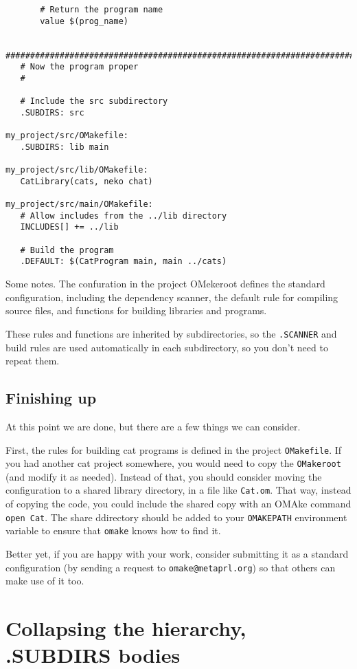 \begin{verbatim}
       # Return the program name
       value $(prog_name)

   ########################################################################
   # Now the program proper
   #

   # Include the src subdirectory
   .SUBDIRS: src

my_project/src/OMakefile:
   .SUBDIRS: lib main

my_project/src/lib/OMakefile:
   CatLibrary(cats, neko chat)

my_project/src/main/OMakefile:
   # Allow includes from the ../lib directory
   INCLUDES[] += ../lib

   # Build the program
   .DEFAULT: $(CatProgram main, main ../cats)
\end{verbatim}

Some notes.  The confuration in the project OMekeroot defines the standard configuration, including
the dependency scanner, the default rule for compiling source files, and functions for building
libraries and programs.

These rules and functions are inherited by subdirectories, so the \verb+.SCANNER+ and build rules
are used automatically in each subdirectory, so you don't need to repeat them.

\subsection{Finishing up}

At this point we are done, but there are a few things we can consider.

First, the rules for building cat programs is defined in the project \verb+OMakefile+.  If you had
another cat project somewhere, you would need to copy the \verb+OMakeroot+ (and modify it as
needed).  Instead of that, you should consider moving the configuration to a shared library
directory, in a file like \verb+Cat.om+.  That way, instead of copying the code, you could include
the shared copy with an OMAke command \verb+open Cat+.  The share ddirectory should be added to your
\verb+OMAKEPATH+ environment variable to ensure that \verb+omake+ knows how to find it.

Better yet, if you are happy with your work, consider submitting it as a standard configuration (by
sending a request to \verb+omake@metaprl.org+) so that others can make use of it too.

\section{Collapsing the hierarchy, .SUBDIRS bodies}

